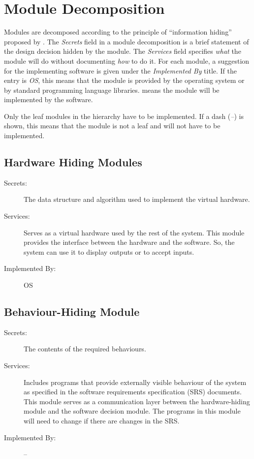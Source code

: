 \documentclass[12pt, titlepage]{article}
\begin{document}
\section{Module Decomposition} \label{SecMD}

Modules are decomposed according to the principle of ``information hiding''
proposed by \citet{ParnasEtAl1984}. The \emph{Secrets} field in a module
decomposition is a brief statement of the design decision hidden by the
module. The \emph{Services} field specifies \emph{what} the module will do
without documenting \emph{how} to do it. For each module, a suggestion for the
implementing software is given under the \emph{Implemented By} title. If the
entry is \emph{OS}, this means that the module is provided by the operating
system or by standard programming language libraries.  \emph{\progname{}} means the
module will be implemented by the \progname{} software.

Only the leaf modules in the hierarchy have to be implemented. If a dash
(\emph{--}) is shown, this means that the module is not a leaf and will not have
to be implemented. 

\subsection{Hardware Hiding Modules }

\begin{description}
\item[Secrets:]The data structure and algorithm used to implement the virtual
  hardware.
\item[Services:]Serves as a virtual hardware used by the rest of the
  system. This module provides the interface between the hardware and the
  software. So, the system can use it to display outputs or to accept inputs.
\item[Implemented By:] OS
\end{description}

\subsection{Behaviour-Hiding Module}

\begin{description}
\item[Secrets:]The contents of the required behaviours.
\item[Services:]Includes programs that provide externally visible behaviour of
  the system as specified in the software requirements specification (SRS)
  documents. This module serves as a communication layer between the
  hardware-hiding module and the software decision module. The programs in this
  module will need to change if there are changes in the SRS.
\item[Implemented By:] --
\end{description}
\end{document}

